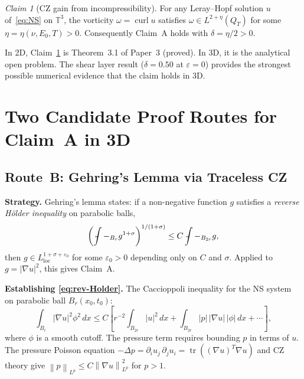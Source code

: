 \documentclass[11pt]{article}
\theoremstyle{definition}
\theoremstyle{remark}
\newtheorem{claim}[theorem]{Claim}
\newcommand{\T}{\mathbb{T}}
\newcommand{\norm}[1]{\left\|#1\right\|}
\newcommand{\grad}{\nabla}
\newcommand{\curl}{\operatorname{curl}}
\newcommand{\dx}{\,dx}
\newcommand{\Xint}{\mathop{\,\rlap{-}\!\!\int}\nolimits}
\newcommand{\dlt}{\delta}
\newcommand{\eps}{\varepsilon}
\begin{document}
\begin{claim}[CZ gain from incompressibility]\label{claim:CZ-incompress}
  For any Leray--Hopf solution $u$ of~\eqref{eq:NS} on $\T^3$,
  the vorticity $\omega=\curl u$ satisfies $\omega\in L^{2+\eta}(Q_T)$
  for some $\eta=\eta(\nu,E_0,T)>0$.  Consequently Claim~A holds with
  $\dlt=\eta/2>0$.
\end{claim}

In 2D, Claim~\ref{claim:CZ-incompress} is Theorem~3.1 of Paper~3 (proved).
In 3D, it is the analytical open problem.  The shear layer result ($\dlt=0.50$
at $\eps=0$) provides the strongest possible numerical evidence that the claim
holds in 3D.

\section{Two Candidate Proof Routes for Claim~A in 3D}
\label{sec:proof-routes}

\subsection{Route~B: Gehring's Lemma via Traceless CZ}
\label{sec:routeB}

\textbf{Strategy.}
Gehring's lemma states: if a non-negative function $g$ satisfies a
\emph{reverse H\"older inequality} on parabolic balls,
\begin{equation}\label{eq:rev-Holder}
  \left(\Xint-_{B_r} g^{1+\sigma}\right)^{1/(1+\sigma)}
  \leq C \Xint-_{B_{2r}} g,
\end{equation}
then $g\in L^{1+\sigma+\eps_0}_{\mathrm{loc}}$ for some $\eps_0>0$ depending
only on $C$ and $\sigma$.  Applied to $g=|\grad u|^2$, this gives Claim~A.

\textbf{Establishing \eqref{eq:rev-Holder}.}
The Caccioppoli inequality for the NS system on parabolic ball $B_r(x_0,t_0)$:
\begin{equation}\label{eq:Caccioppoli}
  \int_{B_r}|\grad u|^2\phi^2\dx
  \leq C\left[r^{-2}\int_{B_{2r}}|u|^2\dx
    + \int_{B_{2r}}|p|\,|\grad u|\,|\phi|\dx
    + \cdots\right],
\end{equation}
where $\phi$ is a smooth cutoff.  The pressure term requires bounding $p$
in terms of $u$.  The pressure Poisson equation
$-\Delta p = \partial_i u_j\,\partial_j u_i = \operatorname{tr}((\grad u)^T\grad u)$
and CZ theory give $\norm{p}_{L^p}\leq C\norm{\grad u}^2_{L^p}$ for $p>1$.
\end{document}
